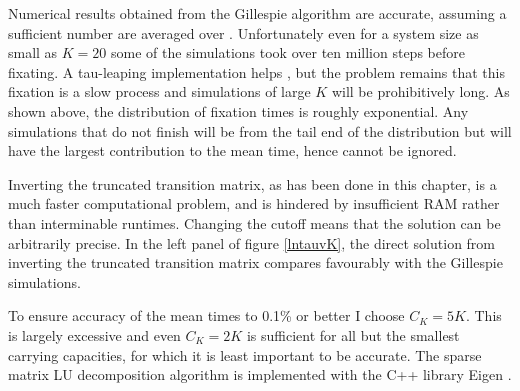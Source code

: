 
Numerical results obtained from the Gillespie algorithm are accurate, assuming a sufficient number are averaged over \cite{Gillespie1977}. 
Unfortunately even for a system size as small as $K=20$ some of the simulations took over ten million steps before fixating. 
A tau-leaping implementation helps \cite{Cao2006}, but the problem remains that this fixation is a slow process and simulations of large $K$ will be prohibitively long. 
As shown above, the distribution of fixation times is roughly exponential. 
Any simulations that do not finish will be from the tail end of the distribution but will have the largest contribution to the mean time, hence cannot be ignored. 

Inverting the truncated transition matrix, as has been done in this chapter, is a much faster computational problem, and is hindered by insufficient RAM rather than interminable runtimes. 
Changing the cutoff means that the solution can be arbitrarily precise. 
In the left panel of figure \ref{lntauvK}, the direct solution from inverting the truncated transition matrix compares favourably with the Gillespie simulations. 

To ensure accuracy of the mean times to 0.1\% or better I choose $C_K=5K$. 
This is largely excessive and even $C_K=2K$ is sufficient for all but the smallest carrying capacities, for which it is least important to be accurate. 
The sparse matrix LU decomposition algorithm is implemented with the C++ library Eigen \cite{eigenweb}. 

